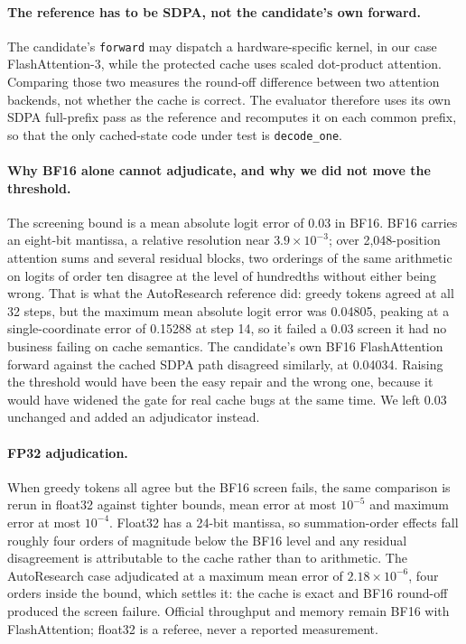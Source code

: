 \documentclass{article}
\begin{document}
\paragraph{The reference has to be SDPA, not the candidate's own forward.} The candidate's \texttt{forward} may dispatch a hardware-specific kernel, in our case FlashAttention-3, while the protected cache uses scaled dot-product attention. Comparing those two measures the round-off difference between two attention backends, not whether the cache is correct. The evaluator therefore uses its own SDPA full-prefix pass as the reference and recomputes it on each common prefix, so that the only cached-state code under test is \texttt{decode\_one}.

\paragraph{Why BF16 alone cannot adjudicate, and why we did not move the threshold.} The screening bound is a mean absolute logit error of 0.03 in BF16. BF16 carries an eight-bit mantissa, a relative resolution near $3.9\times10^{-3}$; over 2,048-position attention sums and several residual blocks, two orderings of the same arithmetic on logits of order ten disagree at the level of hundredths without either being wrong. That is what the AutoResearch reference did: greedy tokens agreed at all 32 steps, but the maximum mean absolute logit error was 0.04805, peaking at a single-coordinate error of 0.15288 at step 14, so it failed a 0.03 screen it had no business failing on cache semantics. The candidate's own BF16 FlashAttention forward against the cached SDPA path disagreed similarly, at 0.04034. Raising the threshold would have been the easy repair and the wrong one, because it would have widened the gate for real cache bugs at the same time. We left 0.03 unchanged and added an adjudicator instead.

\paragraph{FP32 adjudication.} When greedy tokens all agree but the BF16 screen fails, the same comparison is rerun in float32 against tighter bounds, mean error at most $10^{-5}$ and maximum error at most $10^{-4}$. Float32 has a 24-bit mantissa, so summation-order effects fall roughly four orders of magnitude below the BF16 level and any residual disagreement is attributable to the cache rather than to arithmetic. The AutoResearch case adjudicated at a maximum mean error of $2.18\times10^{-6}$, four orders inside the bound, which settles it: the cache is exact and BF16 round-off produced the screen failure. Official throughput and memory remain BF16 with FlashAttention; float32 is a referee, never a reported measurement.
\end{document}
